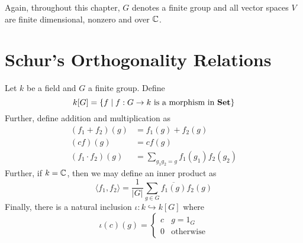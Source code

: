Again, throughout this chapter, $G$ denotes a finite group and all vector spaces $V$ are finite dimensional, nonzero and over $\mathbb{C}$.

\section{Schur's Orthogonality Relations}

\begin{definition}
    Let $k$ be a field and $G$ a finite group. Define 
    \begin{equation*}
        k[G] = \{f\mid f: G\to k\text{ is a morphism in }\mathbf{Set}\}
    \end{equation*}
    Further, define addition and multiplication as 
    \begin{align*}
        (f_1 + f_2)(g) &= f_1(g) + f_2(g)\\
        (cf)(g) &= cf(g)\\
        (f_1\cdot f_2)(g) &= \sum_{g_1g_2 = g}f_1(g_1)f_2(g_2)
    \end{align*}
    Further, if $k = \mathbb{C}$, then we may define an inner product as 
    \begin{equation*}
        \langle f_1,f_2\rangle = \frac{1}{|G|}\sum_{g\in G}\overline{f_1(g)}f_2(g)
    \end{equation*}
    Finally, there is a natural inclusion $\iota: k\hookrightarrow k[G]$ where 
    \begin{equation*}
        \iota(c)(g) = 
        \begin{cases}
            c & g = 1_G\\
            0 & \text{otherwise}
        \end{cases}
    \end{equation*}
\end{definition}

